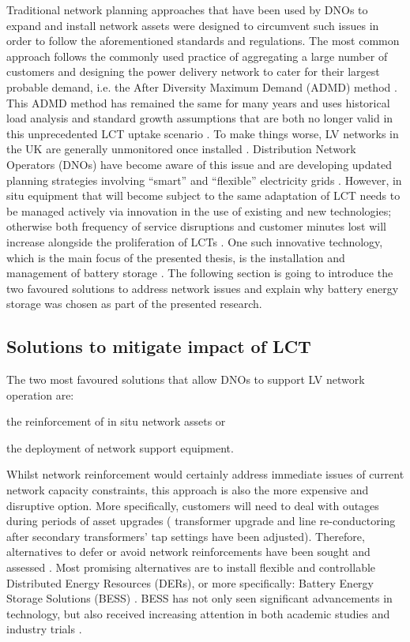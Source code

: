 Traditional network planning approaches that have been used by DNOs to expand and install network assets were designed to circumvent such issues in order to follow the aforementioned standards and regulations.
The most common approach follows the commonly used practice of aggregating a large number of customers and designing the power delivery network to cater for their largest probable demand, i.e. the After Diversity Maximum Demand (ADMD) method \cite{Richardson2010a}.
This ADMD method has remained the same for many years and uses historical load analysis and standard growth assumptions that are both no longer valid in this unprecedented LCT uptake scenario \cite{Yunusov2016}.
To make things worse, LV networks in the UK are generally unmonitored once installed \cite{Yunusov2016}.
Distribution Network Operators (DNOs) have become aware of this issue and are developing updated planning strategies involving ``smart'' and ``flexible'' electricity grids \cite{Fang2012}.
However, in situ equipment that will become subject to the same adaptation of LCT needs to be managed actively via innovation in the use of existing and new technologies; otherwise both frequency of service disruptions and customer minutes lost will increase alongside the proliferation of LCTs \cite{Ault2008a}.
One such innovative technology, which is the main focus of the presented thesis, is the installation and management of battery storage \cite{Chen2009}.
The following section is going to introduce the two favoured solutions to address network issues and explain why battery energy storage was chosen as part of the presented research.


\subsection{Solutions to mitigate impact of LCT}
\label{ch-introduction:subsec:solutions-to-mitigate-impact-of-lct}

The two most favoured solutions that allow DNOs to support LV network operation are:
\begin{enumerate*}
	\item the reinforcement of in situ network assets or
	\item the deployment of network support equipment.
\end{enumerate*}
Whilst network reinforcement would certainly address immediate issues of current network capacity constraints, this approach is also the more expensive and disruptive option.
More specifically, customers will need to deal with outages during periods of asset upgrades ( transformer upgrade and line re-conductoring after secondary transformers' tap settings have been adjusted).
Therefore, alternatives to defer or avoid network reinforcements have been sought and assessed \cite{Harrison2007, Zangs2016a, VanderKlauw2016d, Greenwood2017}.
Most promising alternatives are to install flexible and controllable Distributed Energy Resources (DERs), or more specifically: Battery Energy Storage Solutions (BESS) \cite{Wade2010}.
BESS has not only seen significant advancements in technology, but also received increasing attention in both academic studies and industry trials \cite{Palizban2016}.


